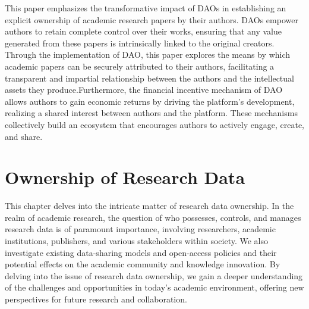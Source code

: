 \documentclass[lettersize,journal]{IEEEtran}
\begin{document}
This paper emphasizes the transformative impact of DAOs in establishing an explicit ownership of academic research papers by their authors. DAOs empower authors to retain complete control over their works, ensuring that any value generated from these papers is intrinsically linked to the original creators. Through the implementation of DAO, this paper explores the means by which academic papers can be securely attributed to their authors, facilitating a transparent and impartial relationship between the authors and the intellectual assets they produce.Furthermore, the financial incentive mechanism of DAO allows authors to gain economic returns by driving the platform's development, realizing a shared interest between authors and the platform. These mechanisms collectively build an ecosystem that encourages authors to actively engage, create, and share.

\section{Ownership of Research Data}

This chapter delves into the intricate matter of research data ownership. In the realm of academic research, the question of who possesses, controls, and manages research data is of paramount importance, involving researchers, academic institutions, publishers, and various stakeholders within society. We also investigate existing data-sharing models and open-access policies and their potential effects on the academic community and knowledge innovation. By delving into the issue of research data ownership, we gain a deeper understanding of the challenges and opportunities in today's academic environment, offering new perspectives for future research and collaboration.
\end{document}
